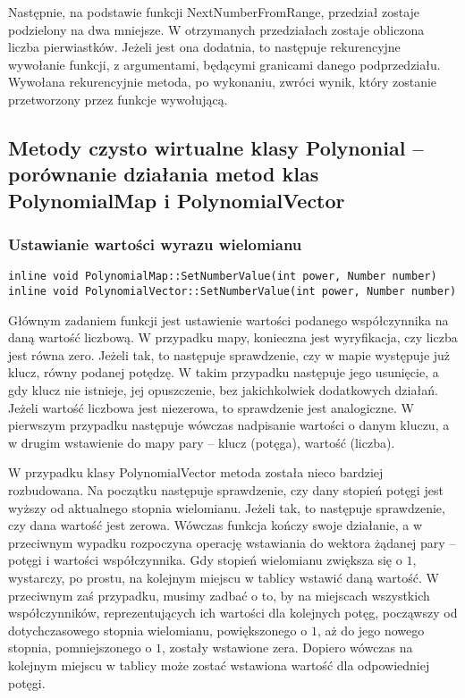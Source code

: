 \documentclass[twoside,a4paper]{book}
\begin{document}
Następnie, na podstawie funkcji NextNumberFromRange, przedział zostaje podzielony na dwa mniejsze. W otrzymanych przedziałach zostaje obliczona liczba pierwiastków. Jeżeli jest ona dodatnia, to następuje rekurencyjne wywołanie funkcji, z argumentami, będącymi granicami danego podprzedziału. Wywołana rekurencyjnie metoda, po wykonaniu, zwróci wynik, który zostanie przetworzony przez funkcje wywołującą. 
\\

\subsection{Metody czysto wirtualne klasy Polynonial – porównanie działania metod klas PolynomialMap i PolynomialVector}

\subsubsection{Ustawianie wartości wyrazu wielomianu}
\begin{lstlisting}
inline void PolynomialMap::SetNumberValue(int power, Number number)
inline void PolynomialVector::SetNumberValue(int power, Number number)
\end{lstlisting}

Głównym zadaniem funkcji jest ustawienie wartości podanego współczynnika na daną wartość liczbową. W przypadku mapy, konieczna jest wyryfikacja, czy liczba jest równa zero. Jeżeli tak, to następuje sprawdzenie, czy w mapie występuje już klucz, równy podanej potędzę. W takim przypadku następuje jego usunięcie, a gdy klucz nie istnieje, jej opuszczenie, bez jakichkolwiek dodatkowych działań. Jeżeli wartość liczbowa jest niezerowa, to sprawdzenie jest analogiczne. W pierwszym przypadku następuje wówczas nadpisanie wartości o danym kluczu, a w drugim wstawienie do mapy pary – klucz (potęga), wartość (liczba).

W przypadku klasy PolynomialVector metoda została nieco bardziej rozbudowana. Na początku następuje sprawdzenie, czy dany stopień potęgi jest wyższy od aktualnego stopnia wielomianu. Jeżeli tak, to następuje sprawdzenie, czy dana wartość jest zerowa. Wówczas funkcja kończy swoje działanie, a w przeciwnym wypadku rozpoczyna operację wstawiania do wektora żądanej pary – potęgi i wartości współczynnika. Gdy stopień wielomianu zwiększa się o $1$, wystarczy, po prostu, na kolejnym miejscu w tablicy wstawić daną wartość. W przeciwnym zaś przypadku, musimy zadbać o to, by na miejscach wszystkich współczynników, reprezentujących ich wartości dla kolejnych potęg, począwszy od dotychczasowego stopnia wielomianu, powiększonego o $1$, aż do jego nowego stopnia, pomniejszonego o $1$, zostały wstawione zera. Dopiero wówczas na kolejnym miejscu w tablicy może zostać wstawiona wartość dla odpowiedniej potęgi.
\end{document}
